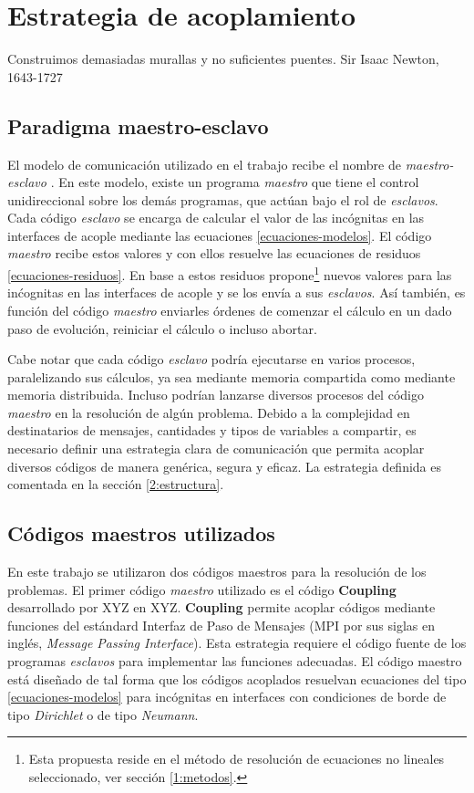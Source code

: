\chapter{Estrategia de acoplamiento}
\label{chap2}
\chapterquote
{Construimos demasiadas murallas y no suficientes puentes.}
{Sir Isaac Newton, 1643-1727}

\section{Paradigma maestro-esclavo}
\label{2:maestro-esclavo}

El modelo de comunicación utilizado en el trabajo recibe el nombre de \textit{maestro-esclavo} \cite{maestro-esclavo}.
En este modelo, existe un programa \textit{maestro} que tiene el control unidireccional sobre los demás programas, que actúan bajo el rol de \textit{esclavos}.
Cada código \textit{esclavo} se encarga de calcular el valor de las incógnitas en las interfaces de acople mediante las ecuaciones \ref{ecuaciones-modelos}.
El código \textit{maestro} recibe estos valores y con ellos resuelve las ecuaciones de residuos \ref{ecuaciones-residuos}.
En base a estos residuos propone\footnote{
Esta propuesta reside en el método de resolución de ecuaciones no lineales seleccionado, ver sección \ref{1:metodos}.
} nuevos valores para las inćognitas en las interfaces de acople y se los envía a sus \textit{esclavos}.
Así también, es función del código \textit{maestro} enviarles órdenes de comenzar el cálculo en un dado paso de evolución, reiniciar el cálculo o incluso abortar.

Cabe notar que cada código \textit{esclavo} podría ejecutarse en varios procesos, paralelizando sus cálculos,
ya sea mediante memoria compartida como mediante memoria distribuida.
Incluso podrían lanzarse diversos procesos del código \textit{maestro} en la resolución de algún problema.
Debido a la complejidad en destinatarios de mensajes, cantidades y tipos de variables a compartir,
es necesario definir una estrategia clara de comunicación
que permita acoplar diversos códigos de manera genérica, segura y eficaz.
La estrategia definida es comentada en la sección \ref{2:estructura}.

\section{Códigos maestros utilizados}
\label{2:maestros}

En este trabajo se utilizaron dos códigos maestros para la resolución de los problemas.
El primer código \textit{maestro} utilizado es el código \textbf{Coupling} desarrollado por XYZ en XYZ.
\textbf{Coupling} permite acoplar códigos mediante funciones del estándard Interfaz de Paso de Mensajes (MPI por sus siglas en inglés, \textit{Message Passing Interface}).
Esta estrategia requiere el código fuente de los programas \textit{esclavos} para implementar las funciones adecuadas.
El código maestro está diseñado de tal forma que los códigos acoplados resuelvan ecuaciones del tipo \ref{ecuaciones-modelos}
para incógnitas en interfaces con condiciones de borde de tipo \textit{Dirichlet} o de tipo \textit{Neumann}.

